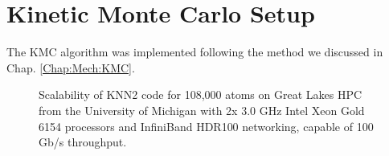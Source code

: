 \newpage
\section{Kinetic Monte Carlo Setup}
\label{Chap:Al/Vac:section:KMC}

The \ac{KMC} algorithm was implemented following the method we discussed in Chap. \ref{Chap:Mech:KMC}. 


\newpage
\begingroup
\begin{figure}[!ht]
  \centering
\caption[Scalability of KNN2 code on Great Lakes HPC.]{Scalability of KNN2 code for 108,000 atoms on Great Lakes HPC from the University of Michigan with 2x 3.0 GHz Intel Xeon Gold 6154 processors and InfiniBand HDR100 networking, capable of 100 Gb/s throughput.}
\label{Chap:Al/Vac:fig:scale}
\end{figure}
\endgroup
